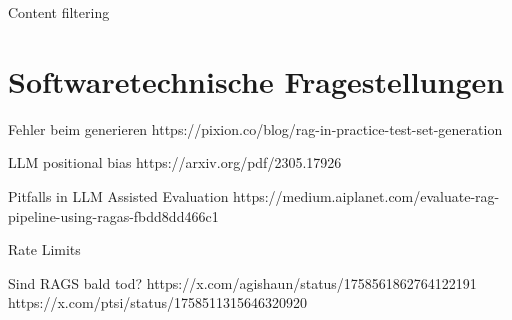 Content filtering

\section{Softwaretechnische Fragestellungen}

Fehler beim generieren https://pixion.co/blog/rag-in-practice-test-set-generation

LLM positional bias https://arxiv.org/pdf/2305.17926

Pitfalls in LLM Assisted Evaluation https://medium.aiplanet.com/evaluate-rag-pipeline-using-ragas-fbdd8dd466c1

Rate Limits

Sind RAGS bald tod?
https://x.com/agishaun/status/1758561862764122191
https://x.com/ptsi/status/1758511315646320920
